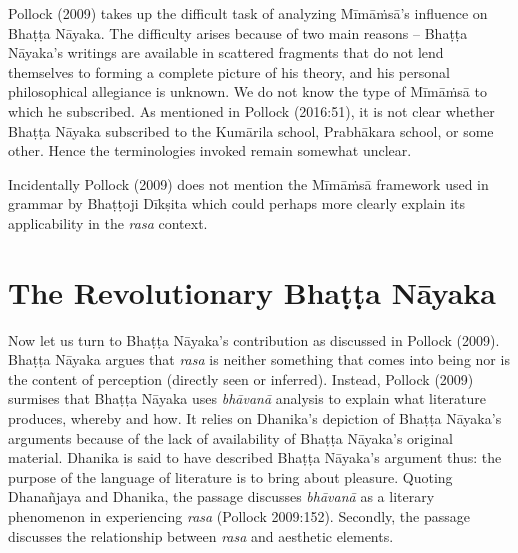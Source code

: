 Pollock (2009) takes up the difficult task of analyzing Mīmāṁsā’s influence on Bhaṭṭa Nāyaka. The difficulty arises because of two main reasons -- Bhaṭṭa Nāyaka’s writings are available in scattered fragments that do not lend themselves to forming a complete picture of his theory, and his personal philosophical allegiance is unknown. We do not know the type of Mīmāṁsā to which he subscribed. As mentioned in Pollock (2016:51), it is not clear whether Bhaṭṭa Nāyaka subscribed to the Kumārila school, Prabhākara school, or some other. Hence the terminologies invoked remain somewhat unclear.

 Incidentally Pollock (2009) does not mention the Mīmāṁsā framework used in grammar by Bhaṭṭoji Dīkṣita which could perhaps more clearly explain its applicability in the \textsl{rasa} context.\\[-20pt] 

\section*{The Revolutionary Bhaṭṭa Nāyaka}

Now let us turn to Bhaṭṭa Nāyaka’s contribution as discussed in Pollock (2009). Bhaṭṭa Nāyaka argues that \textsl{rasa} is neither something that comes into being nor is the content of perception (directly seen or inferred). Instead, Pollock (2009) surmises that Bhaṭṭa Nāyaka uses \textsl{bhāvanā} analysis to explain what literature produces, whereby and how. It relies on Dhanika’s depiction of Bhaṭṭa Nāyaka’s arguments because of the lack of availability of Bhaṭṭa Nāyaka’s original material. Dhanika is said to have described Bhaṭṭa Nāyaka’s argument thus: the purpose of the language of literature is to bring about pleasure. Quoting Dhanañjaya and Dhanika, the passage discusses \textsl{bhāvanā} as a literary phenomenon in experiencing \textsl{rasa} (Pollock 2009:152). Secondly, the passage discusses the relationship between \textsl{rasa} and aesthetic elements.

